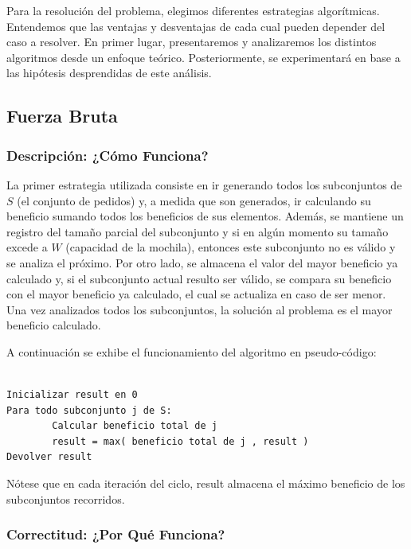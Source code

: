 \documentclass[a4paper]{article}
\newenvironment{codesnippet}{%
	\begin{Sbox}\begin{minipage}{\textwidth}\sffamily\small}%
	{\end{minipage}\end{Sbox}%
		\begin{center}%
		\vspace{-0.4cm}\colorbox{litegrey}{\TheSbox}\end{center}\vspace{0.3cm}}
\begin{document}
Para la resolución del problema, elegimos diferentes estrategias algorítmicas. Entendemos que las ventajas y desventajas de cada cual pueden depender del caso a resolver. En primer lugar, presentaremos y analizaremos los distintos algoritmos desde un enfoque teórico. Posteriormente, se experimentará en base a las hipótesis desprendidas de este análisis.  

\subsection{Fuerza Bruta}

\subsubsection{Descripción: ¿Cómo Funciona?}

La primer estrategia utilizada consiste en ir generando todos los subconjuntos de $S$ (el conjunto de pedidos) y, a medida que son generados, ir calculando su beneficio sumando todos los beneficios de sus elementos. Además, se mantiene un registro del tamaño parcial del subconjunto y si en algún momento su tamaño excede a $W$ (capacidad de la mochila), entonces este subconjunto no es válido y se analiza el próximo. Por otro lado, se almacena el valor del mayor beneficio ya calculado y, si el subconjunto actual resulto ser válido, se compara su beneficio con el mayor beneficio ya calculado, el cual se actualiza en caso de ser menor. Una vez analizados todos los subconjuntos, la solución al problema es el mayor beneficio calculado.

A continuación se exhibe el funcionamiento del algoritmo en pseudo-código:

\begin{codesnippet}
\begin{verbatim}

Inicializar result en 0
Para todo subconjunto j de S:
        Calcular beneficio total de j
        result = max( beneficio total de j , result )
Devolver result

\end{verbatim}
\end{codesnippet}

Nótese que en cada iteración del ciclo, result almacena el máximo beneficio de los subconjuntos recorridos.

\subsubsection{Correctitud: ¿Por Qué Funciona?}
\end{document}
